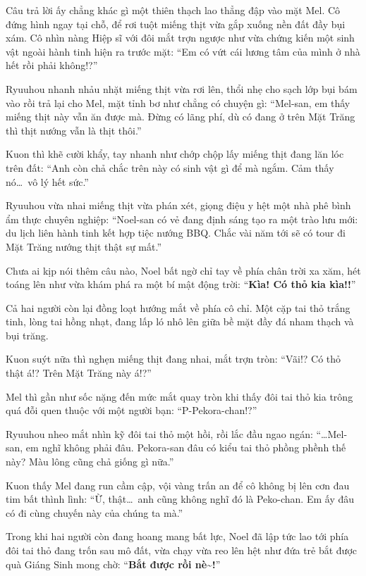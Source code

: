 \documentclass[../main.tex]{subfiles}
\begin{document}
Câu trả lời ấy chẳng khác gì một thiên thạch lao thẳng đập vào mặt Mel. Cô đứng hình ngay tại chỗ, để rơi tuột miếng thịt vừa gắp xuống nền đất đầy bụi xám. Cô nhìn nàng Hiệp sĩ với đôi mắt trợn ngược như vừa chứng kiến một sinh vật ngoài hành tinh hiện ra trước mặt: ``Em có vứt cái lương tâm của mình ở nhà hết rồi phải không!?''

Ryuuhou nhanh nhảu nhặt miếng thịt vừa rơi lên, thổi nhẹ cho sạch lớp bụi bám vào rồi trả lại cho Mel, mặt tỉnh bơ như chẳng có chuyện gì: ``Mel-san, em thấy miếng thịt này vẫn ăn được mà. Đừng có lãng phí, dù có đang ở trên Mặt Trăng thì thịt nướng vẫn là thịt thôi.''

Kuon thì khẽ cười khẩy, tay nhanh như chớp chộp lấy miếng thịt đang lăn lóc trên đất: ``Anh còn chả chắc trên này có sinh vật gì để mà ngắm. Cảm thấy nó\dots\ vô lý hết sức.''

Ryuuhou vừa nhai miếng thịt vừa phán xét, giọng điệu y hệt một nhà phê bình ẩm thực chuyên nghiệp: ``Noel-san có vẻ đang định sáng tạo ra một trào lưu mới: du lịch liên hành tinh kết hợp tiệc nướng BBQ. Chắc vài năm tới sẽ có tour đi Mặt Trăng nướng thịt thật sự mất.''

Chưa ai kịp nói thêm câu nào, Noel bất ngờ chỉ tay về phía chân trời xa xăm, hét toáng lên như vừa khám phá ra một bí mật động trời: ``\textbf{Kìa! Có thỏ kia kìa!!}''

Cả hai người còn lại đồng loạt hướng mắt về phía cô chỉ. Một cặp tai thỏ trắng tinh, lòng tai hồng nhạt, đang lấp ló nhô lên giữa bề mặt đầy đá nham thạch và bụi trăng.

Kuon suýt nữa thì nghẹn miếng thịt đang nhai, mắt trợn tròn: ``Vãi!? Có thỏ thật á!? Trên Mặt Trăng này á!?''

Mel thì gần như sốc nặng đến mức mắt quay tròn khi thấy đôi tai thỏ kia trông quá đỗi quen thuộc với một người bạn: ``P-Pekora-chan!?''

Ryuuhou nheo mắt nhìn kỹ đôi tai thỏ một hồi, rồi lắc đầu ngao ngán: ``\dots Mel-san, em nghĩ không phải đâu. Pekora-san đâu có kiểu tai thỏ phồng phềnh thế này? Màu lông cũng chả giống gì nữa.''

Kuon thấy Mel đang run cầm cập, vội vàng trấn an để cô không bị lên cơn đau tim bất thình lình: ``Ừ, thật\dots\ anh cũng không nghĩ đó là Peko-chan. Em ấy đâu có đi cùng chuyến này của chúng ta mà.''

Trong khi hai người còn đang hoang mang bất lực, Noel đã lập tức lao tới phía đôi tai thỏ đang trốn sau mô đất, vừa chạy vừa reo lên hệt như đứa trẻ bắt được quà Giáng Sinh mong chờ: ``\textbf{Bắt được rồi nè\~{}!}''
\end{document}
